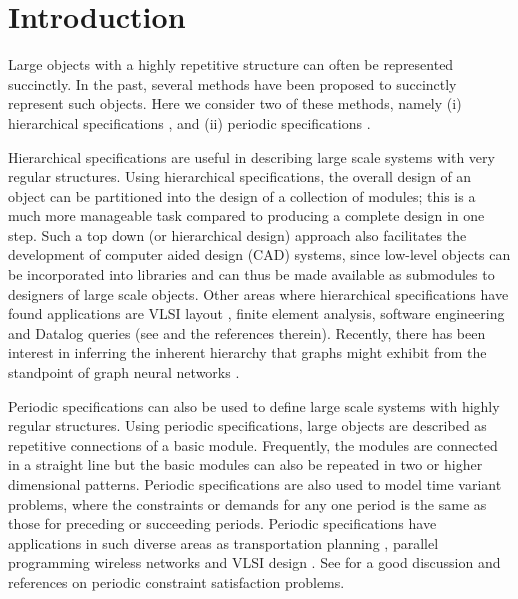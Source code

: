 \section{Introduction}
\label{sec:intro}

Large objects with a highly repetitive structure can often be represented
succinctly.
In the past, several methods have been proposed to succinctly 
represent such objects.
Here we consider two of these methods, namely
(i) hierarchical specifications  
\cite{Ga82,GW83,LW92,BOW83,RH93,LW93,MH+93a,MH+94,marathe1995complexity,Wa86},
and (ii) periodic specifications 
\cite{CM91,HW92,IS87,KO91,KS88,Or82a,Wa93}.
 


Hierarchical specifications are useful in describing large scale systems with
very regular structures. 
Using hierarchical specifications, the overall design of an object can be 
partitioned into the design of a collection of modules;
this is a 
much more manageable task compared to producing a complete design in one step.
Such a top down (or hierarchical design) approach 
also facilitates the development of computer aided design (CAD) systems, since
low-level objects can be  incorporated into libraries and can thus be made
available as submodules to designers of large scale  objects.
Other areas where hierarchical specifications have found applications are
VLSI layout \cite{Le82,Le86,Le90,HLW92,HW92,RH93},  
finite element analysis, software engineering and Datalog queries 
(see \cite{HLW92,Ma94,marathe1995complexity,bottcher2020simulation,goller2005fixpoint,brenguier2012comparison,lohrey2012model,tapken1999implementing,AC94} 
and the references therein).  Recently, there has been interest in
inferring the inherent hierarchy that graphs might exhibit from the
standpoint of graph neural networks \cite{ying2018hierarchical}.

Periodic specifications
can also be used to define large scale systems with highly regular structures.
Using  periodic specifications, 
large objects are  described as repetitive connections of a basic module.
Frequently, the modules are connected in a straight line 
but the basic modules can also  be repeated in two or higher
dimensional patterns. Periodic specifications are also used to 
model time variant  problems,  where the constraints
or demands  for any one period is the same as those for preceding or 
succeeding periods. 
Periodic specifications 
have applications in such diverse areas  as  transportation planning
\cite{Or82a,HLW92,marathe1995complexity,drucker2019cyclic,ho2015cyclic},
parallel programming \cite{HLW92,KMW67} wireless networks 
\cite{andreou2002radiocoloring,fotakis2006radiocolorings} and 
VLSI design \cite{IS87,IS88}. 
See \cite{chen2003periodic,chen2005periodic} for a good discussion and 
references on periodic constraint satisfaction problems.

